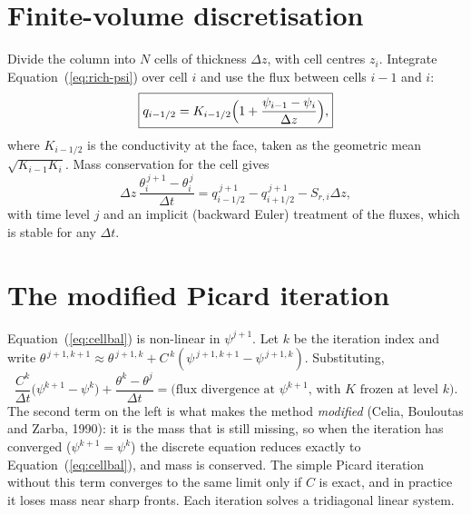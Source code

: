 \section{Finite-volume discretisation}
Divide the column into $N$ cells of thickness $\Delta z$, with cell centres $z_i$. Integrate Equation~(\ref{eq:rich-psi}) over cell $i$ and use the flux between cells $i-1$ and $i$:
\begin{equation}\label{eq:face}\boxed{q_{i-1/2}=K_{i-1/2}\Bigl(1+\frac{\psi_{i-1}-\psi_i}{\Delta z}\Bigr),}\end{equation}
where $K_{i-1/2}$ is the conductivity at the face, taken as the geometric mean $\sqrt{K_{i-1}K_i}$. Mass conservation for the cell gives
\begin{equation}\label{eq:cellbal}\boxed{\Delta z\,\frac{\theta_i^{\,j+1}-\theta_i^{\,j}}{\Delta t}=q_{i-1/2}^{\,j+1}-q_{i+1/2}^{\,j+1}-S_{r,i}\Delta z,}\end{equation}
with time level $j$ and an implicit (backward Euler) treatment of the fluxes, which is stable for any $\Delta t$.

\section{The modified Picard iteration}
Equation~(\ref{eq:cellbal}) is non-linear in $\psi^{j+1}$. Let $k$ be the iteration index and write $\theta^{\,j+1,k+1}\approx\theta^{\,j+1,k}+C^{\,k}(\psi^{\,j+1,k+1}-\psi^{\,j+1,k})$. Substituting,
\begin{equation}\label{eq:picard}
\frac{C^{k}}{\Delta t}\bigl(\psi^{k+1}-\psi^{k}\bigr)+\frac{\theta^{k}-\theta^{j}}{\Delta t}=\text{(flux divergence at }\psi^{k+1}\text{, with }K\text{ frozen at level }k).
\end{equation}
The second term on the left is what makes the method \emph{modified} (Celia, Bouloutas and Zarba, 1990): it is the mass that is still missing, so when the iteration has converged ($\psi^{k+1}=\psi^k$) the discrete equation reduces exactly to Equation~(\ref{eq:cellbal}), and mass is conserved. The simple Picard iteration without this term converges to the same limit only if $C$ is exact, and in practice it loses mass near sharp fronts. Each iteration solves a tridiagonal linear system.

